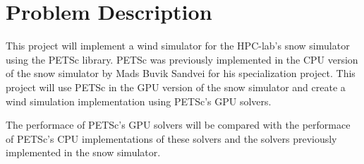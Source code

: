 \section{Problem Description}

This project will implement a wind simulator for the HPC-lab's snow simulator 
using the PETSc library. PETSc was previously implemented in the CPU version
of the snow simulator by Mads Buvik Sandvei for his specialization project.
This project will use PETSc in the GPU version of the snow simulator
and create a wind simulation implementation using PETSc's GPU solvers.

The performace of PETSc's GPU solvers will be compared with the performace
of PETSc's CPU implementations of these solvers and the solvers previously
implemented in the snow simulator.